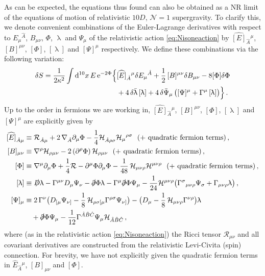 \documentclass[a4paper,10pt,openany]{article}
\def\rme{\mathrm{e}}
\def\rmd{\mathrm{d}}
\newcommand{\lr}{\left(}
\newcommand{\rr}{\right)}
\begin{document}
	As can be expected, the equations thus found can also be obtained as a NR limit of the equations of motion of relativistic $10D$, $\mathcal{N}=1$ supergravity. To clarify this, we denote convenient combinations of the Euler-Lagrange derivatives with respect to $E_{\mu}{}^{\hat{A}}$, $B_{\mu\nu}$, $\Phi$, $\uplambda$ and $\Psi_\mu$ of the relativistic action \eqref{eq:Nisoneaction} by $\widehat{[E]}_{\hat{A}}{}^{\mu}$, $[B]^{\mu\nu}$, $[\Phi]$, $[\uplambda]$ and $[\Psi]^\mu$ respectively. We define these combinations via the following variation:
	\begin{align}\label{eq:releom}
		\delta S = \frac{1}{2\kappa^2}\int \rmd^{10} x \,E\,\rme^{-2\Phi}\Big\{ & \widehat{[E]}_{\hat{A}}{}^\mu \delta E_\mu{}^{\hat{A}} + \frac12\,[B]^{\mu\nu}\delta B_{\mu\nu}  - 8[\Phi]\delta\Phi \notag\\
		& + 4\,\delta\bar\uplambda\,[\uplambda]+ 4\,\delta\bar\Psi_\mu\,\big([\Psi]^\mu + \Gamma^\mu\,[\uplambda]\big) \Big\}\,.
	\end{align}
	Up to the order in fermions we are working in, $\widehat{[E]}_{\hat{A}}{}^{\mu}$, $[B]^{\mu\nu}$, $[\Phi]$, $[\uplambda]$ and $[\Psi]^\mu$ are explicitly given by
	\begin{subequations} \label{eq:releoms}
		\begin{align}
			\widehat{[E]}_{\hat{A}\mu} & \equiv \mathcal R_{\hat{A}\mu} + 2\,\nabla_{\hat{A}}\partial_\mu\Phi - \frac14 \mathcal{H}_{\hat{A}\rho\sigma} \mathcal{H}_\mu{}^{\rho\sigma} \ \ (+ \text{ quadratic fermion terms})\,, \label{eq:EOM1}\\
			[B]_{\mu\nu} & \equiv \nabla^\rho \mathcal{H}_{\rho\mu\nu} - 2\lr\partial^\rho\Phi\rr \mathcal{H}_{\rho\mu\nu} \ \ (+ \text{ quadratic fermion terms}) \,, \label{eq:EOM2} \\
			[\Phi] &\equiv \nabla^\mu\partial_\mu\Phi + \frac14 \mathcal{R}- \partial^\mu\Phi\partial_\mu\Phi - \frac{1}{48}\, \mathcal{H}_{\mu\nu\rho} \mathcal{H}^{\mu\nu\rho} \ \ (+ \text{ quadratic fermion terms}) \,, \label{eq:EOM3}\\
			[\uplambda]&\equiv\slashed D\uplambda - \Gamma^{\mu\nu}D_\mu\Psi_\nu - \slashed\partial\Phi\uplambda - \Gamma^\mu\slashed\partial\Phi\Psi_\mu - \frac{1}{24}\mathcal H^{\mu\nu\rho}\big(\Gamma^\sigma{}_{\mu\nu\rho}\Psi_\sigma + \Gamma_{\mu\nu\rho}\uplambda\big) \,,\\
			[\Psi]_\mu&\equiv 2\,\Gamma^\nu\big(D_{[\mu}\Psi_{\nu]}-\frac18\,\mathcal H_{\rho\sigma[\mu}\Gamma^{\rho\sigma}\Psi_{\nu]}\big) -  \big(D_\mu - \frac18\,\mathcal H_{\mu\nu\rho}\Gamma^{\nu\rho}\big)\uplambda \notag\\
			&\quad+ \slashed\partial\Phi\Psi_\mu- \frac{1}{12} \Gamma^{\hat A\hat B\hat C}\Psi_\mu\mathcal H_{\hat A\hat B\hat C}  \,,
		\end{align}
	\end{subequations}
	where (as in the relativistic action \eqref{eq:Nisoneaction}) the Ricci tensor $\mathcal{R}_{\mu\nu}$ and all covariant derivatives are constructed from the relativistic Levi-Civita (spin) connection. For brevity, we have not explicitly given the quadratic fermion terms in $\widehat{E}_{\hat{A}}{}^\mu$, $[B]_{\mu\nu}$ and $[\Phi]$.
	
\end{document}
